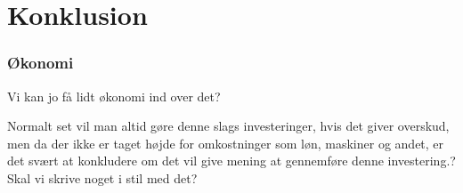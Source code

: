 \chapter{Konklusion}

\subsection{Økonomi}

Vi kan jo få lidt økonomi ind over det? 

Normalt set vil man altid gøre denne slags investeringer, hvis det giver overskud, men da der ikke er taget højde for omkostninger som løn, maskiner og andet, er det svært at konkludere om det vil give mening at gennemføre denne investering.?
Skal vi skrive noget i stil med det?